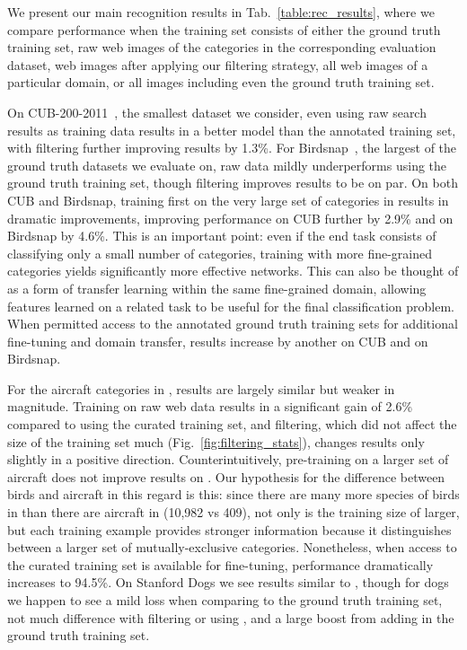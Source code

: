 \documentclass[runningheads]{llncs}
\begin{document}
We present our main recognition results in Tab.~\ref{table:rec_results}, where we compare performance when the training set consists of either the ground truth training set, raw web images of the categories in the corresponding evaluation dataset, web images after applying our filtering strategy, all web images of a particular domain, or all images including even the ground truth training set.

On CUB-200-2011~\cite{wahcub2002011}, the smallest dataset we consider, even using raw search results as training data results in a better model than the annotated training set, with filtering further improving results by 1.3\%.
For Birdsnap~\cite{bergbirdsnapcvpr2014}, the largest of the ground truth datasets we evaluate on, raw data mildly underperforms using the ground truth training set, though filtering improves results to be on par.
On both CUB and Birdsnap, training first on the very large set of categories in \lbird{} results in dramatic improvements, improving performance on CUB further by 2.9\% and on Birdsnap by 4.6\%.
This is an important point: even if the end task consists of classifying only a small number of categories, training with more fine-grained categories yields significantly more effective networks.
This can also be thought of as a form of transfer learning within the same fine-grained domain, allowing features learned on a related task to be useful for the final classification problem.
When permitted access to the annotated ground truth training sets for additional fine-tuning and domain transfer, results increase by another  on CUB and  on Birdsnap.

For the aircraft categories in \fgvc{}, results are largely similar but weaker in magnitude.
Training on raw web data results in a significant gain of 2.6\% compared to using the curated training set, and filtering, which did not affect the size of the training set much (Fig.~\ref{fig:filtering_stats}), changes results only slightly in a positive direction.
Counterintuitively, pre-training on a larger set of aircraft does not improve results on \fgvc{}.
Our hypothesis for the difference between birds and aircraft in this regard is this: since there are many more species of birds in \lbird{} than there are aircraft in \lair{} (10,982 vs 409), not only is the training size of \lbird{} larger, but each training example provides stronger information because it distinguishes between a larger set of mutually-exclusive categories.
Nonetheless, when access to the curated training set is available for fine-tuning, performance dramatically increases to 94.5\%.
On Stanford Dogs we see results similar to \fgvc{}, though for dogs we happen to see a mild loss when comparing to the ground truth training set, not much difference with filtering or using \ldog{}, and a large boost from adding in the ground truth training set.
\end{document}
